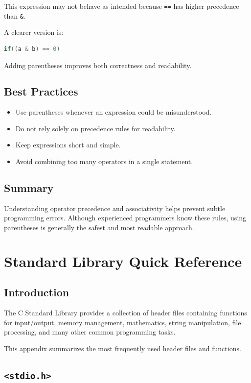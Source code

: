 \documentclass[12pt,openany]{book}
\begin{document}
This expression may not behave as intended because \texttt{==} has higher precedence than \texttt{\&}.

A clearer version is:

\begin{lstlisting}[language=C]
if((a & b) == 0)
\end{lstlisting}

Adding parentheses improves both correctness and readability.

\section{Best Practices}

\begin{itemize}
    \item Use parentheses whenever an expression could be misunderstood.
    \item Do not rely solely on precedence rules for readability.
    \item Keep expressions short and simple.
    \item Avoid combining too many operators in a single statement.
\end{itemize}

\section{Summary}

Understanding operator precedence and associativity helps prevent subtle programming errors. Although experienced programmers know these rules, using parentheses is generally the safest and most readable approach.
\chapter{Standard Library Quick Reference}

\section{Introduction}

The C Standard Library provides a collection of header files containing functions for input/output, memory management, mathematics, string manipulation, file processing, and many other common programming tasks.

This appendix summarizes the most frequently used header files and functions.

\section{\texttt{<stdio.h>}}
\end{document}
